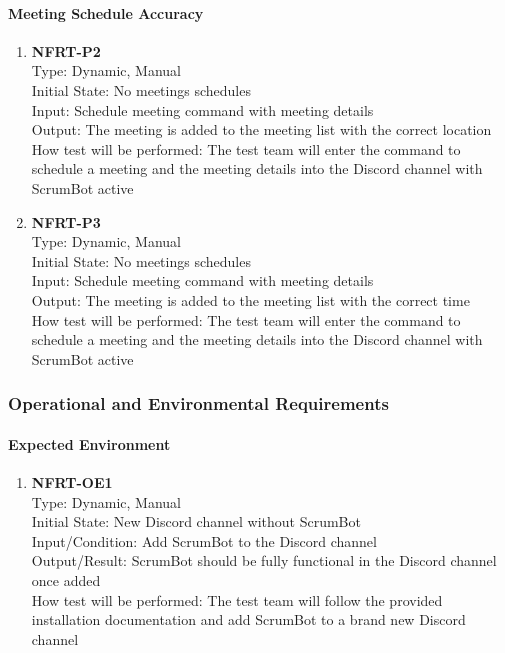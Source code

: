 \documentclass[12pt, titlepage]{article}
\begin{document}
\paragraph{Meeting Schedule Accuracy}
\begin{enumerate}
\item{\textbf{NFRT-P2}}\\
Type: Dynamic, Manual\\
Initial State: No meetings schedules\\
Input: Schedule meeting command with meeting details\\
Output: The meeting is added to the meeting list with the correct location\\
How test will be performed: The test team will enter the command to schedule a meeting and the meeting details into the Discord channel with ScrumBot active

\item{\textbf{NFRT-P3}}\\
Type: Dynamic, Manual\\
Initial State: No meetings schedules\\
Input: Schedule meeting command with meeting details\\
Output: The meeting is added to the meeting list with the correct time\\
How test will be performed: The test team will enter the command to schedule a meeting and the meeting details into the Discord channel with ScrumBot active
\end{enumerate}

\subsubsection{Operational and Environmental Requirements}
\paragraph{Expected Environment}
\begin{enumerate}

\item{\textbf{NFRT-OE1}}\\
Type: Dynamic, Manual\\
Initial State: New Discord channel without ScrumBot\\
Input/Condition: Add ScrumBot to the Discord channel\\
Output/Result: ScrumBot should be fully functional in the Discord channel once added\\
How test will be performed: The test team will follow the provided installation documentation and add ScrumBot to a brand new Discord channel
\end{enumerate}
\end{document}

